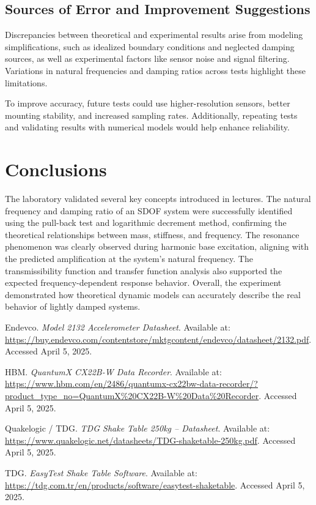 \documentclass{article}  %
\begin{document}
\subsection{Sources of Error and Improvement Suggestions}

Discrepancies between theoretical and experimental results arise from modeling simplifications, such as idealized boundary conditions and neglected damping sources, as well as experimental factors like sensor noise and signal filtering. Variations in natural frequencies and damping ratios across tests highlight these limitations.

To improve accuracy, future tests could use higher-resolution sensors, better mounting stability, and increased sampling rates. Additionally, repeating tests and validating results with numerical models would help enhance reliability.

\newpage

\section{Conclusions}

The laboratory validated several key concepts introduced in lectures. The natural frequency and damping ratio of an SDOF system were successfully identified using the pull-back test and logarithmic decrement method, confirming the theoretical relationships between mass, stiffness, and frequency. The resonance phenomenon was clearly observed during harmonic base excitation, aligning with the predicted amplification at the system’s natural frequency. The transmissibility function and transfer function analysis also supported the expected frequency-dependent response behavior. Overall, the experiment demonstrated how theoretical dynamic models can accurately describe the real behavior of lightly damped systems.

\newpage
\begin{thebibliography}{99}

Endevco. \textit{Model 2132 Accelerometer Datasheet}. Available at: \url{https://buy.endevco.com/contentstore/mktgcontent/endevco/datasheet/2132.pdf}. Accessed April 5, 2025.

HBM. \textit{QuantumX CX22B-W Data Recorder}. Available at: \url{https://www.hbm.com/en/2486/quantumx-cx22bw-data-recorder/?product_type_no=QuantumX%20CX22B-W%20Data%20Recorder}. Accessed April 5, 2025.

Quakelogic / TDG. \textit{TDG Shake Table 250kg – Datasheet}. Available at: \url{https://www.quakelogic.net/datasheets/TDG-shaketable-250kg.pdf}. Accessed April 5, 2025.

TDG. \textit{EasyTest Shake Table Software}. Available at: \url{https://tdg.com.tr/en/products/software/easytest-shaketable}. Accessed April 5, 2025.

\end{thebibliography}
\end{document}
